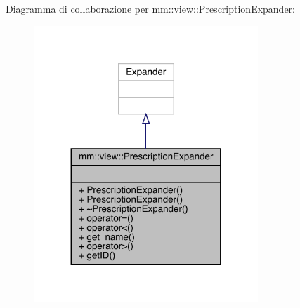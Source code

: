 Diagramma di collaborazione per mm\+:\+:view\+:\+:Prescription\+Expander\+:
\nopagebreak
\begin{figure}[H]
\begin{center}
\leavevmode
\includegraphics[width=239pt]{df/d9c/classmm_1_1view_1_1_prescription_expander__coll__graph}
\end{center}
\end{figure}
